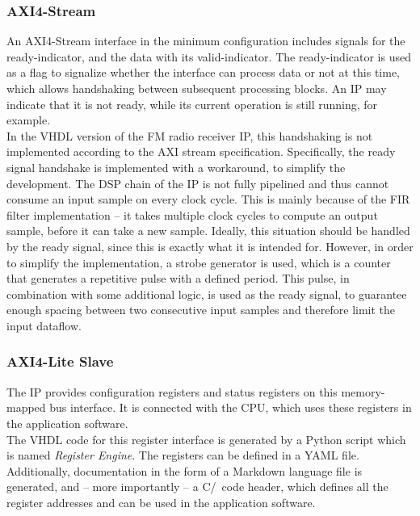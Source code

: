 \subsubsection{AXI4-Stream}

An AXI4-Stream interface in the minimum configuration includes signals for the ready-indicator, and the data with its valid-indicator.
The ready-indicator is used as a flag to signalize whether the interface can process data or not at this time, which allows handshaking between subsequent processing blocks.
An IP may indicate that it is not ready, while its current operation is still running, for example.\\

In the VHDL version of the FM radio receiver IP, this handshaking is not implemented according to the AXI stream specification.
Specifically, the ready signal handshake is implemented with a workaround, to simplify the development.
The DSP chain of the IP is not fully pipelined and thus cannot consume an input sample on every clock cycle.
This is mainly because of the FIR filter implementation -- it takes multiple clock cycles to compute an output sample, before it can take a new sample.
Ideally, this situation should be handled by the ready signal, since this is exactly what it is intended for.
However, in order to simplify the implementation, a strobe generator is used, which is a counter that generates a repetitive pulse with a defined period.
This pulse, in combination with some additional logic, is used as the ready signal, to guarantee enough spacing between two consecutive input samples and therefore limit the input dataflow.

\subsubsection{AXI4-Lite Slave}

The IP provides configuration registers and status registers on this memory-mapped bus interface.
It is connected with the CPU, which uses these registers in the application software.\\

The VHDL code for this register interface is generated by a Python script which is named \textit{Register Engine}.
The registers can be defined in a YAML file.
Additionally, documentation in the form of a Markdown language file is generated, and -- more importantly -- a C/\cplusplus\ code header, which defines all the register addresses and can be used in the application software.\\

